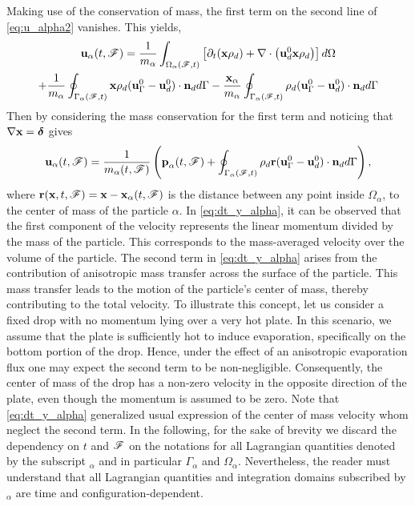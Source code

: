 Making use of the conservation of mass, the first term on the second line of \ref{eq:u_alpha2} vanishes. This yields,%
\begin{multline}
    \textbf{u}_\alpha(t,\mathscr{F}) = 
    \frac{1}{m_\alpha}\int_{\Omega_{\alpha}(\mathscr{F},t)}  \left[
        \partial_t (\textbf{x}\rho_d ) + \mathbf{\nabla}\cdot\left(\textbf{u}_d^0 \textbf{x} \rho_d\right) 
    \right] d\Omega \\
    + \frac{1}{m_\alpha}\oint_{\Gamma_{\alpha}(\mathscr{F},t)}  \textbf{x} \rho_d(\textbf{u}_\Gamma^0   - \textbf{u}_d^0) \cdot \textbf{n}_d  d\Gamma
    -  \frac{\textbf{x}_\alpha}{m_\alpha}    \oint_{\Gamma_{\alpha}(\mathscr{F},t)}  \rho_d(\textbf{u}_\Gamma^0   - \textbf{u}_d^0) \cdot \textbf{n}_d  d\Gamma
\end{multline}
Then by considering the mass conservation for the first term and noticing that $\mathbf{\nabla} \textbf{x} = \bm\delta$ gives%
\begin{equation}
    \textbf{u}_\alpha(t,\FF) = \frac{1}{m_\alpha(t,\FF)} \left(
        \textbf{p}_\alpha(t,\FF)
        +  \intSF{\rho_d \textbf{r} (\textbf{u}_\Gamma^0 - \textbf{u}_d^0)\cdot \textbf{n}_d }
        \right),
        \label{eq:dt_y_alpha}
\end{equation}
where $\textbf{r}(\textbf{x},t,\mathscr{F}) = \textbf{x} - \textbf{x}_\alpha(t,\mathscr{F})$ is the distance between any point inside $\Omega_\alpha$, to the center of mass of the particle $\alpha$.
In \ref{eq:dt_y_alpha}, it can be observed that the first component of the velocity represents the linear momentum divided by the mass of the particle. 
This corresponds to the mass-averaged velocity over the volume of the particle.
The second term in \ref{eq:dt_y_alpha} arises from the contribution of anisotropic mass transfer across the surface of the particle. 
This mass transfer leads to the motion of the particle's center of mass, thereby contributing to the total velocity.
To illustrate this concept, let us consider a fixed drop with no momentum lying over a very hot plate.
In this scenario, we assume that the plate is sufficiently hot to induce evaporation, specifically on the bottom portion of the drop.
Hence, under the effect of an anisotropic evaporation flux one may expect the second term to be non-negligible.
Consequently, the center of mass of the drop has a non-zero velocity in the opposite direction of the plate, even though the momentum is assumed to be zero.
Note that \ref{eq:dt_y_alpha} generalized usual expression of the center of mass velocity whom neglect the second term.
In the following, for the sake of brevity we discard the dependency on $t$ and $\mathscr{F}$ on the notations for all Lagrangian quantities denoted by the subscript $_\alpha$ and in particular $\Gamma_\alpha$ and $\Omega_\alpha$.
Nevertheless, the reader must understand that all Lagrangian quantities and integration domains subscribed by $_\alpha$ are time and configuration-dependent. 



